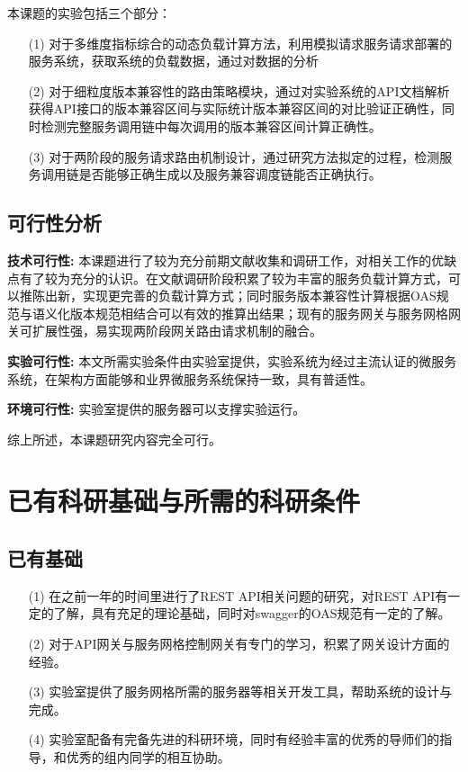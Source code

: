 本课题的实验包括三个部分：\par
\begin{itemize}
    \item[(1)] 对于多维度指标综合的动态负载计算方法，利用模拟请求服务请求部署的服务系统，获取系统的负载数据，通过对数据的分析
    \item[(2)] 对于细粒度版本兼容性的路由策略模块，通过对实验系统的API文档解析获得API接口的版本兼容区间与实际统计版本兼容区间的对比验证正确性，同时检测完整服务调用链中每次调用的版本兼容区间计算正确性。
    \item[(3)] 对于两阶段的服务请求路由机制设计，通过研究方法拟定的过程，检测服务调用链是否能够正确生成以及服务兼容调度链能否正确执行。
\end{itemize}


\subsection{可行性分析}

\textbf{技术可行性:} 本课题进行了较为充分前期文献收集和调研工作，对相关工作的优缺点有了较为充分的认识。在文献调研阶段积累了较为丰富的服务负载计算方式，可以推陈出新，实现更完善的负载计算方式；同时服务版本兼容性计算根据OAS规范与语义化版本规范相结合可以有效的推算出结果；现有的服务网关与服务网格网关可扩展性强，易实现两阶段网关路由请求机制的融合。
\par
\textbf{实验可行性:} 本文所需实验条件由实验室提供，实验系统为经过主流认证的微服务系统，在架构方面能够和业界微服务系统保持一致，具有普适性。
\par
\textbf{环境可行性:} 实验室提供的服务器可以支撑实验运行。\par
综上所述，本课题研究内容完全可行。

\newpage

\section{已有科研基础与所需的科研条件}

\subsection{已有基础}

\begin{itemize}
    \item[(1)] 在之前一年的时间里进行了REST API相关问题的研究，对REST API有一定的了解，具有充足的理论基础，同时对swagger的OAS规范有一定的了解。
    \item[(2)] 对于API网关与服务网格控制网关有专门的学习，积累了网关设计方面的经验。
    \item[(3)] 实验室提供了服务网格所需的服务器等相关开发工具，帮助系统的设计与完成。
    \item[(4)] 实验室配备有完备先进的科研环境，同时有经验丰富的优秀的导师们的指导，和优秀的组内同学的相互协助。
\end{itemize}

